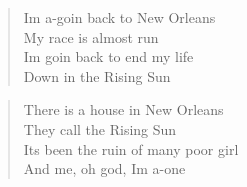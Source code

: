 \documentclass[9pt,a4paper,oneside, onecolumn]{article}
\begin{document}
\begin{multicols}{2}
\begin{verse}
Im a-goin back to New Orleans\\
My race is almost run\\
Im goin back to end my life\\
Down in the Rising Sun\\
\end{verse}

\begin{verse}
There is a house in New Orleans\\
They call the Rising Sun\\
Its been the ruin of many poor girl\\
And me, oh god, Im a-one\\
\end{verse}

\end{multicols}
\end{document}
